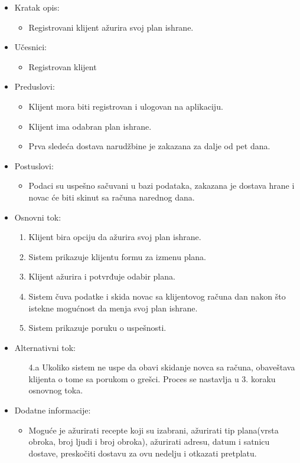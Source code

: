 
\begin{itemize}
    \item Kratak opis:
        \begin{itemize}
            \item Registrovani klijent ažurira svoj plan ishrane.
        \end{itemize}
    \item Učesnici:
        \begin{itemize}
            \item Registrovan klijent
        \end{itemize}
    \item Preduslovi:
        \begin{itemize}
            \item Klijent mora biti registrovan i ulogovan na aplikaciju.
            \item Klijent ima odabran plan ishrane.
            \item Prva sledeća dostava narudžbine je zakazana za dalje od pet dana.
        \end{itemize}
    \item Postuslovi:
        \begin{itemize}
            \item Podaci su uspešno sačuvani u bazi podataka, zakazana je dostava hrane i novac će biti skinut sa računa narednog dana.
        \end{itemize}
    \item Osnovni tok:
        \begin{enumerate}
            \item Klijent bira opciju da ažurira svoj plan ishrane.
            \item Sistem prikazuje klijentu formu za izmenu plana.
            \item Klijent ažurira i potvrđuje odabir plana.
            \item Sistem čuva podatke i skida novac sa klijentovog računa dan nakon što istekne mogućnost da menja svoj plan ishrane.
            \item Sistem prikazuje poruku o uspešnosti. 
        \end{enumerate}
    \item Alternativni tok:
        \begin{itemize}
            \item[4.a] Ukoliko sistem ne uspe da obavi skidanje novca sa računa, obaveštava klijenta o tome sa porukom o grešci. Proces se nastavlja u 3. koraku osnovnog toka.
        \end{itemize}
    \item Dodatne informacije:
        \begin{itemize}
            \item Moguće je ažurirati recepte koji su izabrani, ažurirati tip plana(vrsta obroka, broj ljudi i broj obroka), ažurirati adresu, datum i satnicu dostave, preskočiti dostavu za ovu nedelju i otkazati pretplatu. 
        \end{itemize}
\end{itemize}

